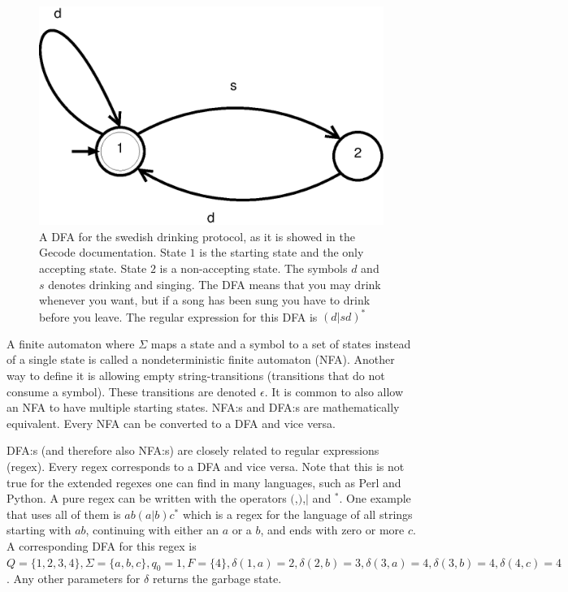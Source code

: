 \documentclass[a4paper,11pt]{article}
\begin{document}
\begin{figure}[H]
\centering
\includegraphics[scale=0.8]{dfa.eps}
\caption{A DFA for the swedish drinking protocol, as it is showed in the Gecode documentation. State $1$ is the starting state and the only accepting state. State $2$ is a non-accepting state. The symbols $d$ and $s$ denotes drinking and singing. The DFA means that you may drink whenever you want, but if a song has been sung you have to drink before you leave. The regular expression for this DFA is $(d|sd)^{*}$}
\label{fig:dfasdp}
\end{figure}

A finite automaton where $\Sigma$ maps a state and a symbol to a set of states instead of a single state is called a nondeterministic finite automaton (NFA). Another way to define it is allowing empty string-transitions (transitions that do not consume a symbol). These transitions are denoted $\epsilon$. It is common to also allow an NFA to have multiple starting states. NFA:s and DFA:s are mathematically equivalent. Every NFA can be converted to a DFA and vice versa.

DFA:s (and therefore also NFA:s) are closely related to regular expressions (regex). Every regex corresponds to a DFA and vice versa. Note that this is not true for the extended regexes one can find in many languages, such as Perl and Python. A pure regex can be written with the operators $($,$)$,$|$ and $^{*}$. One example that uses all of them is $ab(a|b)c^{*}$ which is a regex for the language of all strings starting with $ab$, continuing with either an $a$ or a $b$, and ends with zero or more $c$. A corresponding DFA for this regex is $Q=\{1,2,3,4\}, \Sigma=\{a,b,c\}, q_0=1, F=\{4\}, \delta(1,a)=2, \delta(2,b)=3, \delta(3,a)=4, \delta(3,b)=4, \delta(4,c)=4$. Any other parameters for $\delta$ returns the garbage state.
\end{document}
